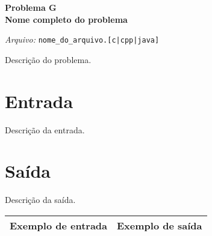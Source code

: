 \newpage

\begin{center}
\LARGE{\textbf{Problema G} \\ \textbf{Nome completo do problema}} 

\vspace{0.5em}
\normalsize

\textit{Arquivo:}
\verb+nome_do_arquivo.[c|cpp|java]+  

\end{center}

Descrição do problema. \\

\section*{Entrada}

Descrição da entrada. \\

\section*{Saída}

Descrição da saída. \\

\begin{center}
  \begin{tabular}{ | l | l | }
    \hline
    \textbf{Exemplo de entrada} & \textbf{Exemplo de saída} \\ 
    \hline
	
	\hline
  \end{tabular}
\end{center}